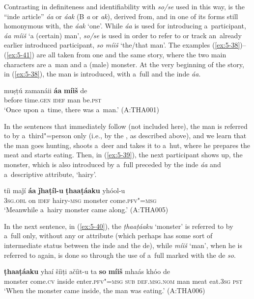 Contrasting in definiteness and identifiability with \textit{so/se} used in this way, is the ``inde article'' \textit{áa} or \textit{áak} (B \textit{a} or \textit{ak}), derived from, and in one of its forms still homonymous with, the  \textit{áak} `one'. While \textit{áa} is used for introducing a~participant, \textit{áa míiš} `a (certain) man', \textit{so/se} is used in order to refer to or track an~already earlier introduced participant, \textit{so míiš} `the/that man'. The examples (\ref{ex:5-38})--(\ref{ex:5-41}) are all taken from one and the same story, where the two main characters are a~man and a (male) monster. At the very beginning of the story, in (\ref{ex:5-38}), the man is introduced, with a~full  and the inde \textit{áa}.

\begin{exe}
\ex
\label{ex:5-38}
\gll muṣṭú zamanáii \textbf{áa} \textbf{míiš} de\\
before time.\textsc{gen} \textsc{idef} man be.\textsc{pst}\\
\glt `Once upon a~time, there was a~man.' (A:THA001)
\end{exe}

In the sentences that immediately follow (not included here), the man is referred to by
a~third"=person  only (i.e., by the  , as described above), and we learn
that the man goes hunting, shoots a~deer and takes it to a~hut, where he prepares the meat and
starts eating. Then, in (\ref{ex:5-39}), the next participant shows up, the monster, which is also
introduced by a~full  preceded by the inde \textit{áa} and a~descriptive attribute,
`hairy'.
\begin{exe}
\ex
\label{ex:5-39}
\gll tíi maǰí \textbf{áa} \textbf{ǰhaṭíl-u} \textbf{ṭhaaṭáaku} yhóol-u\\
\textsc{3sg.obl} on \textsc{idef} hairy-\textsc{msg} monster come.\textsc{pfv"=msg}\\
\glt `Meanwhile a~hairy monster came along.' (A:THA005)
\end{exe}

In the next sentence, in (\ref{ex:5-40}), the \textit{ṭhaaṭáaku} `monster' is referred to by a~full 
only, without any  or attribute (which perhaps has some sort of intermediate status
between the inde and the de), while \textit{míiš} `man', when he is referred to
again, is done so through the use of a~full  marked with the de \textit{so}.
\begin{exe}
\ex
\label{ex:5-40}
\gll \textbf{ṭhaaṭáaku} yhaí šíiṭi ačíit-u ta \textbf{so} \textbf{míiš} mhaás khóo de\\
monster come.\textsc{cv} inside enter.\textsc{pfv"=msg} \textsc{sub} \textsc{def.msg.nom} man meat eat.\textsc{3sg} \textsc{pst}\\
\glt `When the monster came inside, the man was eating.' (A:THA006)
\end{exe}

